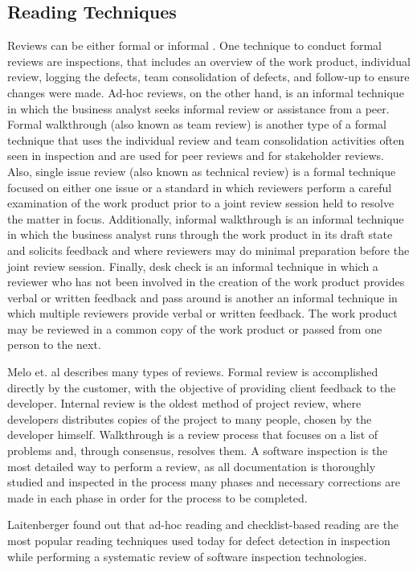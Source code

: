 \subsection{Reading Techniques}

Reviews can be either formal or informal \cite{Babok_2015}. One technique to conduct formal reviews are inspections, that includes an overview of the work product, individual review, logging the defects, team consolidation of defects, and follow-up to ensure changes were made. Ad-hoc reviews, on the other hand, is an informal technique in which the business analyst seeks informal review or assistance from a peer. Formal walkthrough (also known as team review) is another type of a formal technique that uses the individual review and team consolidation activities often seen in inspection and are used for peer reviews and for stakeholder reviews. Also, single issue review (also known as technical review) is a formal technique focused on either one issue or a standard in which reviewers perform a careful examination of the work product prior to a joint review session held to resolve the matter in focus. Additionally, informal walkthrough is an informal technique in which the business analyst runs through the work product in its draft state and solicits feedback and where reviewers may do minimal preparation before the joint review session. Finally, desk check is an informal technique in which a reviewer who has not been involved in the creation of the work product provides verbal or written feedback and pass around is another an informal technique in which multiple reviewers provide verbal or written feedback. The work product may be reviewed in a common copy of the work product or passed from one person to the next.

Melo et. al \cite{Melo_2001} describes many types of reviews. Formal review is accomplished directly by the customer, with the objective of providing client feedback to the developer. Internal review is the oldest method of project review, where developers distributes copies of the project to many people, chosen by the developer himself. Walkthrough is a review process that focuses on a list of problems and, through consensus, resolves them. A software inspection is the most detailed way to perform a review, as all documentation is thoroughly studied and inspected in the process many phases and necessary corrections are made in each phase in order for the process to be completed. 

Laitenberger \cite{Laitenberger_2002} found out that ad-hoc reading and checklist-based reading are the most popular reading techniques used today for defect detection in inspection while performing a systematic review of software inspection technologies.

